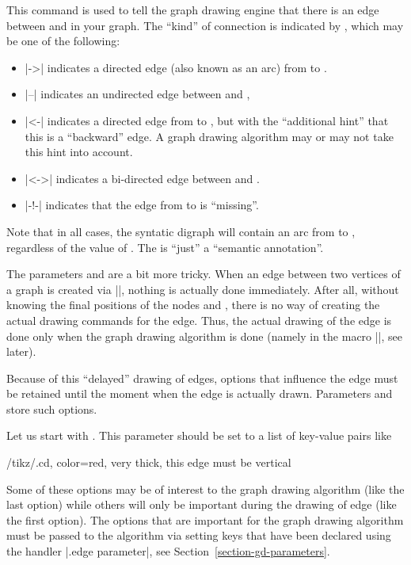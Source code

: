 \begin{command}{\pgfgdedge{}}
  This command is used to tell the graph drawing engine that there is
  an edge between  and  in your
  graph. The ``kind'' of connection is indicated by ,
  which may be one of the following:
  \begin{itemize}
  \item 
    |->| indicates a directed edge (also known as an arc) from
     to .
  \item |--| indicates an undirected edge between 
    and ,
  \item |<-| indicates a directed edge from  to
    , but with the ``additional hint'' that this is a
    ``backward'' edge. A graph drawing algorithm may  or may not take
    this hint into account.
  \item |<->| indicates a bi-directed edge between 
    and . 
  \item |-!-| indicates that the edge from  to
     is ``missing''. 
  \end{itemize}
  Note that in all cases, the syntatic digraph will contain an arc
  from  to , regardless of the
  value of . The  is ``just'' a
  ``semantic annotation''.
  
  The parameters  and  are a bit
  more tricky. When an edge between two vertices of a graph is created
  via |\pgfgdedge|, nothing is actually done immediately. After all,
  without knowing the final positions of the nodes 
  and , there is no way of creating the actual
  drawing commands for the edge. Thus, the actual drawing of the edge
  is done only when the graph drawing algorithm is done (namely in the
  macro |\pgfgdedgecallback|, see later). 

  Because of this ``delayed'' drawing of edges, options that influence
  the edge must be retained until the moment when the edge is actually
  drawn. Parameters  and  store such
  options. 

  Let us start with . This parameter should be set
  to a list of key-value pairs like
\begin{codeexample}
/tikz/.cd, color=red, very thick, this edge must be vertical
\end{codeexample}
  Some of these options may be of interest to the graph drawing
  algorithm (like the last option) while others will 
  only be important during the drawing of edge (like the first
  option). The options that are important for the graph drawing
  algorithm must be passed to the algorithm via setting keys that have
  been declared using the handler |.edge parameter|, see
  Section~\ref{section-gd-parameters}. 


\end{command}
